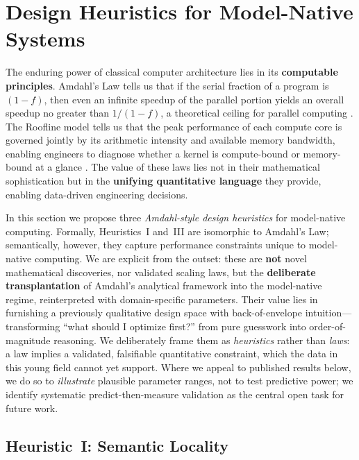 \section{Design Heuristics for Model-Native Systems}
\label{sec:laws}

The enduring power of classical computer architecture lies in its \textbf{computable principles}. Amdahl's Law tells us that if the serial fraction of a program is $(1-f)$, then even an infinite speedup of the parallel portion yields an overall speedup no greater than $1/(1-f)$, a theoretical ceiling for parallel computing \cite{hennessy2017quantitative}. The Roofline model tells us that the peak performance of each compute core is governed jointly by its arithmetic intensity and available memory bandwidth, enabling engineers to diagnose whether a kernel is compute-bound or memory-bound at a glance \cite{hennessy2017quantitative}. The value of these laws lies not in their mathematical sophistication but in the \textbf{unifying quantitative language} they provide, enabling data-driven engineering decisions.

In this section we propose three \emph{Amdahl-style design heuristics} for model-native computing. Formally, Heuristics~I and~III are isomorphic to Amdahl's Law; semantically, however, they capture performance constraints unique to model-native computing. We are explicit from the outset: these are \textbf{not} novel mathematical discoveries, nor validated scaling laws, but the \textbf{deliberate transplantation} of Amdahl's analytical framework into the model-native regime, reinterpreted with domain-specific parameters. Their value lies in furnishing a previously qualitative design space with back-of-envelope intuition---transforming ``what should I optimize first?'' from pure guesswork into order-of-magnitude reasoning. We deliberately frame them as \emph{heuristics} rather than \emph{laws}: a law implies a validated, falsifiable quantitative constraint, which the data in this young field cannot yet support. Where we appeal to published results below, we do so to \emph{illustrate} plausible parameter ranges, not to test predictive power; we identify systematic predict-then-measure validation as the central open task for future work.

\subsection{Heuristic~I: Semantic Locality}
\label{sec:law1}

